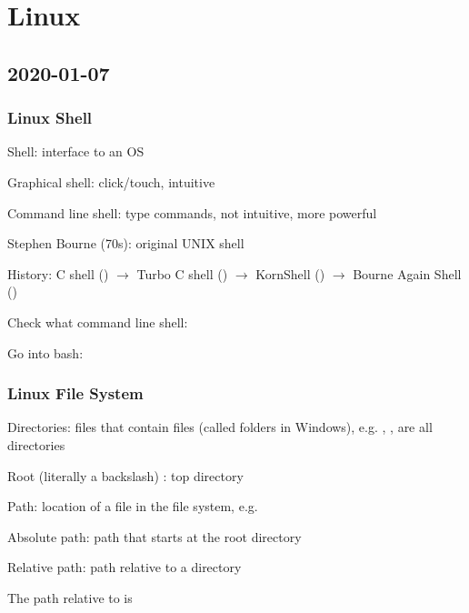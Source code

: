 \chapter{Linux}
\section{2020-01-07}

\subsection{Linux Shell}

Shell: interface to an OS

Graphical shell: click/touch, intuitive

Command line shell: type commands, not intuitive, more powerful

Stephen Bourne (70s): original UNIX shell

History: C shell () $ \rightarrow $ Turbo C shell () $ \rightarrow $
KornShell () $ \rightarrow $ Bourne Again Shell ()

Check what command line shell: 

Go into bash: 

\subsection{Linux File System}
Directories: files that contain files (called folders in Windows), e.g.
, ,  are all directories

Root (literally a backslash) \code{/}: top directory

Path: location of a file in the file system, e.g. 

Absolute path: path that starts at the root directory

Relative path: path relative to a directory

The path 
relative to  is 


